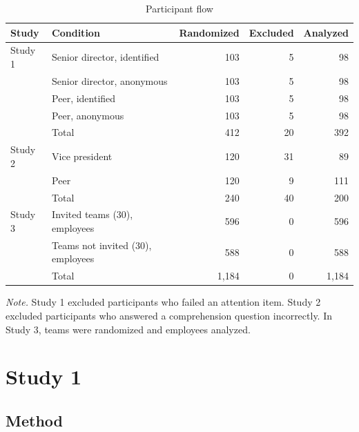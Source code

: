 \documentclass[11pt]{article}
\begin{document}
\begin{table}[ht]
\centering
\caption{Participant flow}
\label{tab:flow}
\small
\begin{tabular}{llrrr}
\toprule
Study & Condition & Randomized & Excluded & Analyzed \\
\midrule
Study 1 & Senior director, identified & 103 & 5 & 98 \\
 & Senior director, anonymous & 103 & 5 & 98 \\
 & Peer, identified & 103 & 5 & 98 \\
 & Peer, anonymous & 103 & 5 & 98 \\
 & Total & 412 & 20 & 392 \\
\midrule
Study 2 & Vice president & 120 & 31 & 89 \\
 & Peer & 120 & 9 & 111 \\
 & Total & 240 & 40 & 200 \\
\midrule
Study 3 & Invited teams (30), employees & 596 & 0 & 596 \\
 & Teams not invited (30), employees & 588 & 0 & 588 \\
 & Total & 1,184 & 0 & 1,184 \\
\bottomrule
\end{tabular}

\smallskip
\parbox{0.9\linewidth}{\footnotesize\textit{Note.} Study 1 excluded participants who failed an attention item. Study 2 excluded participants who answered a comprehension question incorrectly. In Study 3, teams were randomized and employees analyzed.}
\end{table}

\section{Study 1}

\subsection{Method}
\end{document}

